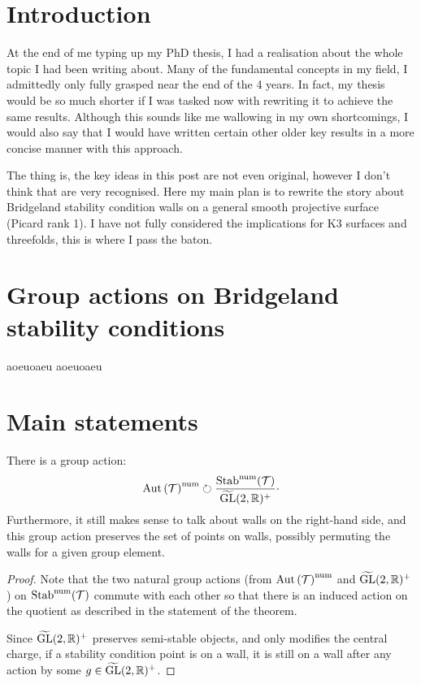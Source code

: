 \documentclass[]{article}
\begin{document}

\maketitle
\tableofcontents

\section{Introduction}
At the end of me typing up my PhD thesis,
I had a realisation about the whole topic I had been writing about.
Many of the fundamental concepts in my field, I admittedly only fully grasped near the end of the 4 years.
In fact, my thesis would be so much shorter if I was tasked now with rewriting it to achieve the same results.
Although this sounds like me wallowing in my own shortcomings, I would also say that I would have written certain other older key results in a more concise manner with this approach.

The thing is, the key ideas in this post are not even original,
however I don't think that are very recognised.
Here my main plan is to rewrite the story about Bridgeland stability condition walls on a general smooth projective surface (Picard rank 1).
I have not fully considered the implications for K3 surfaces and threefolds, this is where I pass the baton.


\section{Group actions on Bridgeland stability conditions}
aoeuoaeu
aoeuoaeu

\section{Main statements}
\begin{theorem}
	There is a group action:
	\[
		\mathrm{Aut}\left(\mathcal{T}\right)^{\mathrm{num}}
		\circlearrowright
		\frac{
			\mathrm{Stab}^{\mathrm{num}}(\mathcal{T})
		}{
			\widetilde{\mathrm{GL}}(2,\mathbb{R})^+
		}\cdot
	\]
	Furthermore, it still makes sense to talk about walls on the right-hand side,
	and this group action preserves the set of points on walls, possibly permuting the walls for a given group element.
\end{theorem}
\begin{proof}
	Note that the two natural group actions
	(from $\mathrm{Aut}\left(\mathcal{T}\right)^{\mathrm{num}}$
	and $\widetilde{\mathrm{GL}}(2,\mathbb{R})^+$)
	on  $\mathrm{Stab}^{\mathrm{num}}(\mathcal{T})$ commute with
	each other so that there is an induced action on the
	quotient as described in the statement of the theorem.

	Since  $\widetilde{\mathrm{GL}}(2,\mathbb{R})^+$ preserves semi-stable objects, and only modifies the central charge, if a stability condition point is on a wall, it is still on a wall after any action by some $g\in\widetilde{\mathrm{GL}}(2,\mathbb{R})^+$.
\end{proof}
\end{document}
